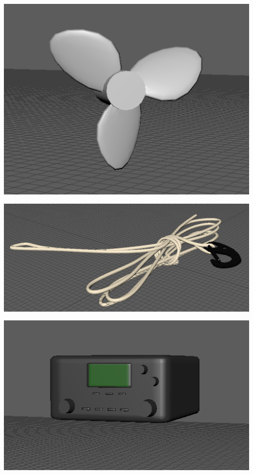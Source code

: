 \documentclass[a4paper, openright, twoside]{book}
\begin{document}
\begin{minipage}{\textwidth}
\begin{center}
\begin{minipage}{0.25\textwidth}
        \centering
        \includegraphics[width=1\textwidth]{images/prop.png}
    \end{minipage}\hfill
    \begin{minipage}{0.25\textwidth}
        \centering
        \includegraphics[width=1\textwidth]{images/tow.png}
    \end{minipage}\hfill
    \begin{minipage}{0.25\textwidth}
        \centering
        \includegraphics[width=1\textwidth]{images/vhf.png}
    \end{minipage}\hfill
\end{center}
\end{minipage}
\end{document}
